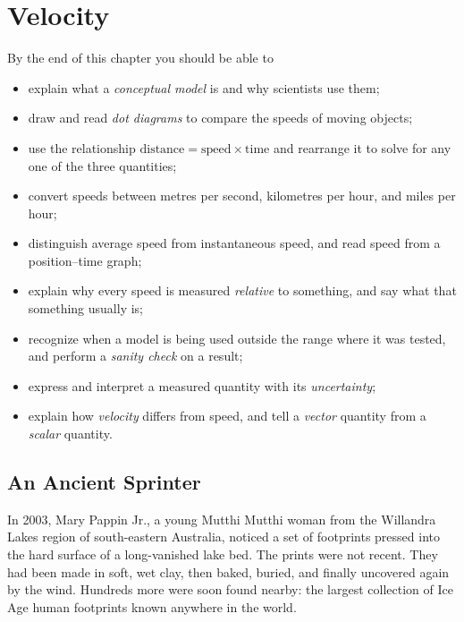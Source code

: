\documentclass[11pt,twoside,openany]{book}
\newcounter{check}[chapter]
\begin{document}
\setcounter{chapter}{0}

\chapter{Velocity}

\begin{tcolorbox}[enhanced,colback=white,colframe=teal,sharp corners,boxrule=1pt,
  title=\textbf{In this chapter},coltitle=white,colbacktitle=teal,left=3mm,right=3mm]
By the end of this chapter you should be able to
\begin{itemize}[itemsep=2pt,topsep=2pt]
  \item explain what a \emph{conceptual model} is and why scientists use them;
  \item draw and read \emph{dot diagrams} to compare the speeds of moving objects;
  \item use the relationship $\text{distance} = \text{speed}\times\text{time}$ and rearrange it to solve for any one of the three quantities;
  \item convert speeds between metres per second, kilometres per hour, and miles per hour;
  \item distinguish average speed from instantaneous speed, and read speed from a position--time graph;
  \item explain why every speed is measured \emph{relative} to something, and say what that something usually is;
  \item recognize when a model is being used outside the range where it was tested, and perform a \emph{sanity check} on a result;
  \item express and interpret a measured quantity with its \emph{uncertainty};
  \item explain how \emph{velocity} differs from speed, and tell a \emph{vector} quantity from a \emph{scalar} quantity.
\end{itemize}
\end{tcolorbox}

\section{An Ancient Sprinter}

In 2003, Mary Pappin Jr., a young Mutthi Mutthi woman from the Willandra Lakes region of south-eastern Australia, noticed a set of footprints pressed into the hard surface of a long-vanished lake bed. The prints were not recent. They had been made in soft, wet clay, then baked, buried, and finally uncovered again by the wind. Hundreds more were soon found nearby: the largest collection of Ice Age human footprints known anywhere in the world.
\end{document}
